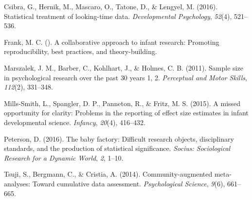 \documentclass[english,floatsintext,man]{apa6}
\begin{document}
Csibra, G., Hernik, M., Mascaro, O., Tatone, D., \& Lengyel, M. (2016).
Statistical treatment of looking-time data. \emph{Developmental
Psychology}, \emph{52}(4), 521--536.

Frank, M. C. (). A collaborative approach to infant research: Promoting
reproducibility, best practices, and theory-building.

Marszalek, J. M., Barber, C., Kohlhart, J., \& Holmes, C. B. (2011).
Sample size in psychological research over the past 30 years 1, 2.
\emph{Perceptual and Motor Skills}, \emph{112}(2), 331--348.

Mills-Smith, L., Spangler, D. P., Panneton, R., \& Fritz, M. S. (2015).
A missed opportunity for clarity: Problems in the reporting of effect
size estimates in infant developmental science. \emph{Infancy},
\emph{20}(4), 416--432.

Peterson, D. (2016). The baby factory: Difficult research objects,
disciplinary standards, and the production of statistical significance.
\emph{Socius: Sociological Research for a Dynamic World}, \emph{2},
1--10.

Tsuji, S., Bergmann, C., \& Cristia, A. (2014). Community-augmented
meta-analyses: Toward cumulative data assessment. \emph{Psychological
Science}, \emph{9}(6), 661--665.
\end{document}
